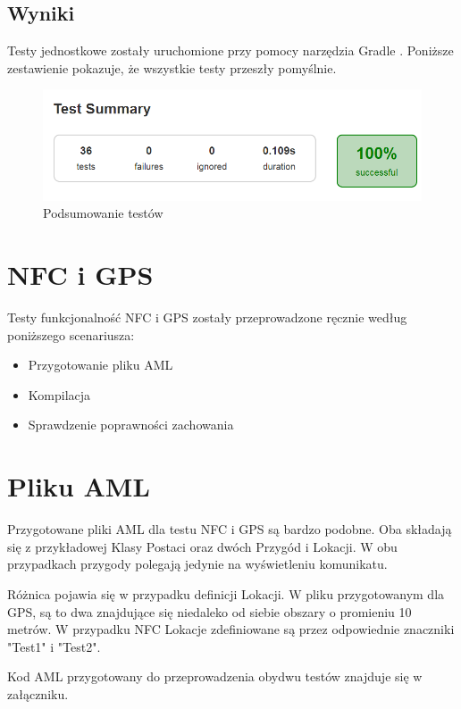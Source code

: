 \documentclass{xmgr}
\begin{document}
\subsection{Wyniki}
Testy jednostkowe zostały uruchomione przy pomocy narzędzia Gradle \cite{Gradle:2017:Doc}. Poniższe zestawienie pokazuje, że wszystkie testy przeszły pomyślnie.

\begin{figure}[!tbh]
	\centering
	\includegraphics[width=1.0\hsize]{fig/test_summary}
	\caption{Podsumowanie testów}
\end{figure}

\section{NFC i GPS}

Testy funkcjonalność NFC i GPS zostały przeprowadzone ręcznie według poniższego scenariusza:

\begin{itemize}
  \item Przygotowanie pliku AML
  \item Kompilacja
  \item Sprawdzenie poprawności zachowania
\end{itemize}

\section{Pliku AML}

Przygotowane pliki AML dla testu NFC i GPS są bardzo podobne. Oba składają się z przykładowej Klasy Postaci oraz dwóch Przygód i Lokacji. W obu przypadkach przygody polegają jedynie na wyświetleniu komunikatu. 

Różnica pojawia się w przypadku definicji Lokacji. W pliku przygotowanym dla GPS, są to dwa znajdujące się niedaleko od siebie obszary o promieniu 10 metrów. W przypadku NFC Lokacje zdefiniowane są przez odpowiednie znaczniki "Test1" i "Test2".

Kod AML przygotowany do przeprowadzenia obydwu testów znajduje się w załączniku.
\end{document}
